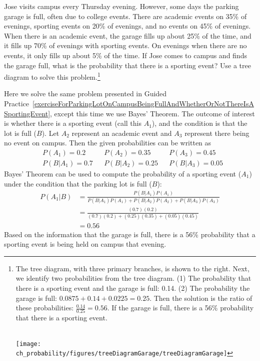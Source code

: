 \begin{exercise} \label{exerciseForParkingLotOnCampusBeingFullAndWhetherOrNotThereIsASportingEvent}
Jose visits campus every Thursday evening. However, some days the parking garage is full, often due to college events. There are academic events on 35\% of evenings, sporting events on 20\% of evenings, and no events on 45\% of evenings. When there is an academic event, the garage fills up about 25\% of the time, and it fills up 70\% of evenings with sporting events. On evenings when there are no events, it only fills up about 5\% of the time. If Jose comes to campus and finds the garage full, what is the probability that there is a sporting event? Use a tree diagram to solve this problem.\footnote{\begin{minipage}[t]{0.47\linewidth}
The tree diagram, with three primary branches, is shown to the right. Next, we identify two probabilities from the tree diagram. (1) The probability that there is a sporting event and the garage is full: 0.14. (2) The probability the garage is full: $0.0875 + 0.14 + 0.0225 = 0.25$. Then the solution is the ratio of these probabilities: $\frac{0.14}{0.25} = 0.56$. If the garage is full, there is a 56\% probability that there is a sporting event. \vspace{0.1mm} \\\ 
\end{minipage}
\begin{minipage}[c]{0.5\linewidth}
\texttt{[image: ch\_probability/figures/treeDiagramGarage/treeDiagramGarage]}\vspace{-30mm}
\end{minipage}}
\end{exercise}

\begin{example}{Here we solve the same problem presented in Guided Practice~\ref{exerciseForParkingLotOnCampusBeingFullAndWhetherOrNotThereIsASportingEvent}, except this time we use Bayes' Theorem.}
The outcome of interest is whether there is a sporting event (call this $A_1$), and the condition is that the lot is full ($B$). Let $A_2$ represent an academic event and $A_3$ represent there being no event on campus. Then the given probabilities can be written as
\begin{align*}
&P(A_1) = 0.2 &&P(A_2) = 0.35 &&P(A_3) = 0.45 \\
&P(B | A_1) = 0.7 &&P(B | A_2) = 0.25 &&P(B | A_3) = 0.05
\end{align*}
Bayes' Theorem can be used to compute the probability of a sporting event ($A_1$) under the condition that the parking lot is full ($B$):
\begin{align*}
P(A_1 | B) &= \frac{P(B | A_1) P(A_1)}{P(B | A_1) P(A_1) + P(B | A_2) P(A_2) + P(B | A_3) P(A_3)} \\
		&= \frac{(0.7)(0.2)}{(0.7)(0.2) + (0.25)(0.35) + (0.05)(0.45)} \\
		&= 0.56 
\end{align*}
Based on the information that the garage is full, there is a 56\% probability that a sporting event is being held on campus that evening.
\end{example}

